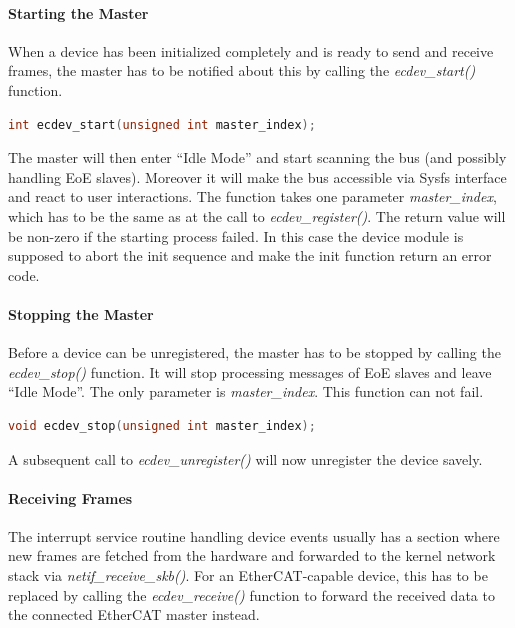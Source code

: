 \documentclass[a4paper,12pt,BCOR6mm,bibtotoc,idxtotoc]{scrbook}
\begin{document}
\paragraph{Starting the Master}

When a device has been initialized completely and is ready to send and
receive frames, the master has to be notified about this by calling
the \textit{ecdev\_start()} function.

\begin{lstlisting}[gobble=2,language=C]
  int ecdev_start(unsigned int master_index);
\end{lstlisting}

The master will then enter ``Idle Mode'' and start scanning the bus
(and possibly handling EoE slaves). Moreover it will make the bus
accessible via Sysfs interface and react to user interactions. The
function takes one parameter \textit{master\_index}, which has to be
the same as at the call to \textit{ecdev\_register()}. The return
value will be non-zero if the starting process failed. In this case
the device module is supposed to abort the init sequence and make the
init function return an error code.

\paragraph{Stopping the Master}

Before a device can be unregistered, the master has to be stopped by
calling the \textit{ecdev\_stop()} function. It will stop processing
messages of EoE slaves and leave ``Idle Mode''. The only parameter is
\textit{master\_index}. This function can not fail.

\begin{lstlisting}[gobble=2,language=C]
  void ecdev_stop(unsigned int master_index);
\end{lstlisting}

A subsequent call to \textit{ecdev\_unregister()} will now unregister
the device savely.

\paragraph{Receiving Frames}

The interrupt service routine handling device events usually has a
section where new frames are fetched from the hardware and forwarded
to the kernel network stack via \textit{netif\_receive\_skb()}. For an
EtherCAT-capable device, this has to be replaced by calling the
\textit{ecdev\_receive()} function to forward the received data to the
connected EtherCAT master instead.
\end{document}

